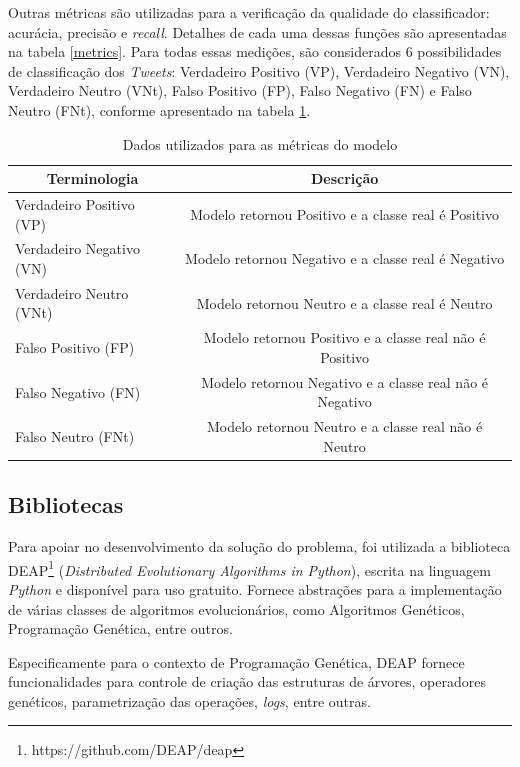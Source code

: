 \documentclass[12pt]{article}
\begin{document}
Outras métricas são utilizadas para a verificação da qualidade do classificador: acurácia, precisão e \emph{recall}. Detalhes de cada uma dessas funções são apresentadas na tabela \ref{metrics}. Para todas essas medições, são considerados 6 possibilidades de classificação dos \emph{Tweets}: Verdadeiro Positivo (VP), Verdadeiro Negativo (VN), Verdadeiro Neutro (VNt), Falso Positivo (FP), Falso Negativo (FN) e Falso Neutro (FNt), conforme apresentado na tabela \ref{metricsTrueFalse}.

\begin{table}[H]
\centering
	\begin{tabular}{lc}
	\multicolumn{1}{c}{\textbf{Terminologia}} & \multicolumn{1}{c}{\textbf{Descrição}} \\ \hline
	Verdadeiro Positivo (VP) & Modelo retornou Positivo e a classe real é Positivo \\ \hline
	Verdadeiro Negativo (VN) & Modelo retornou Negativo e a classe real é Negativo \\ \hline
	Verdadeiro Neutro (VNt) & Modelo retornou Neutro e a classe real é Neutro \\ \hline
	Falso Positivo (FP) & Modelo retornou Positivo e a classe real não é Positivo \\ \hline
	Falso Negativo (FN) & Modelo retornou Negativo e a classe real não é Negativo \\ \hline
	Falso Neutro (FNt) & Modelo retornou Neutro e a classe real não é Neutro \\ \hline
	\end{tabular}
	\caption{Dados utilizados para as métricas do modelo}
	\label{metricsTrueFalse}
\end{table}

\subsection{Bibliotecas}

Para apoiar no desenvolvimento da solução do problema, foi utilizada a biblioteca DEAP\footnote{https://github.com/DEAP/deap} (\emph{Distributed Evolutionary Algorithms in Python}), escrita na linguagem \emph{Python} e disponível para uso gratuito. Fornece abstrações para a implementação de várias classes de algoritmos evolucionários, como Algoritmos Genéticos, Programação Genética, entre outros. \cite{DEAP_JMLR2012}

Especificamente para o contexto de Programação Genética, DEAP fornece funcionalidades para controle de criação das estruturas de árvores, operadores genéticos, parametrização das operações, \emph{logs}, entre outras.
\end{document}
